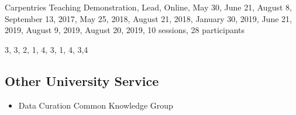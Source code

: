 \item Carpentries Teaching Demonstration, Lead, Online, May 30, June 21,
August 8, September 13, 2017, May 25, 2018, August 21, 2018, January 30, 2019, June 21, 2019,
August 9, 2019,  August 20, 2019, 10 sessions, 28 participants



3, 3, 2, 1, 4, 3, 1, 4, 3,4


\subsection{Other University Service}
\begin{itemize}[label={},leftmargin=!,labelindent=5pt,itemindent=-15pt]
  \item Data Curation Common Knowledge Group
\end{itemize}
